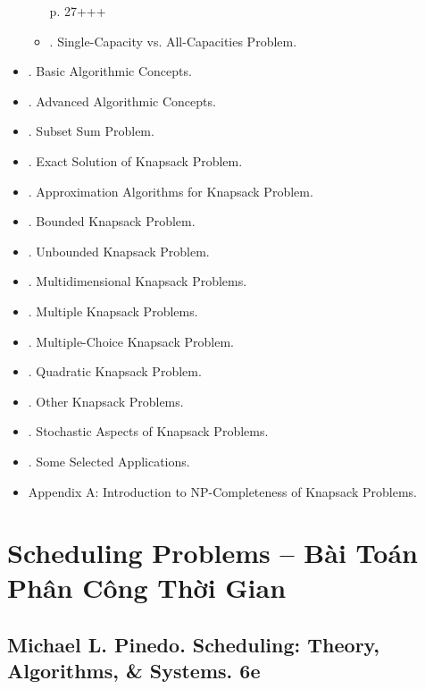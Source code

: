 \documentclass{article}
\begin{document}
\begin{itemize}
\begin{itemize}
        p. 27+++
        \item {. Single-Capacity vs. All-Capacities Problem.}
    \end{itemize}
    \item {. Basic Algorithmic Concepts.}
    \item {. Advanced Algorithmic Concepts.}
    \item {. Subset Sum Problem.}
    \item {. Exact Solution of Knapsack Problem.}
    \item {. Approximation Algorithms for Knapsack Problem.}
    \item {. Bounded Knapsack Problem.}
    \item {. Unbounded Knapsack Problem.}
    \item {. Multidimensional Knapsack Problems.}
    \item {. Multiple Knapsack Problems.}
    \item {. Multiple-Choice Knapsack Problem.}
    \item {. Quadratic Knapsack Problem.}
    \item {. Other Knapsack Problems.}
    \item {. Stochastic Aspects of Knapsack Problems.}
    \item {. Some Selected Applications.}
    \item {\sf Appendix A: Introduction to NP-Completeness of Knapsack Problems.}
\end{itemize}



\section{Scheduling Problems -- Bài Toán Phân Công Thời Gian}


\subsection{{\sc Michael L. Pinedo}. Scheduling: Theory, Algorithms, \& Systems. 6e}
\end{document}
